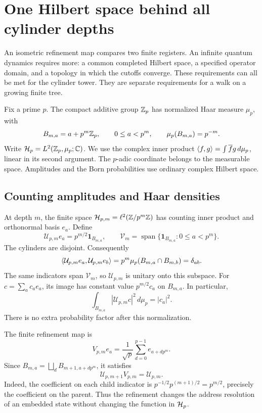 \section{One Hilbert space behind all cylinder depths}
\label{a-limit-hilbert}

An isometric refinement map compares two finite registers. An infinite
quantum dynamics requires more: a common completed Hilbert space, a
specified operator domain, and a topology in which the cutoffs converge.
These requirements can all be met for the cylinder tower. They are separate
requirements for a walk on a growing finite tree.

Fix a prime $p$. The compact additive group $\mathbb Z_p$ has normalized Haar
measure $\mu_p$, with
\[
 B_{m,a}=a+p^m\mathbb Z_p,\qquad 0\leq a<p^m,\qquad
 \mu_p(B_{m,a})=p^{-m}.
\]
Write $\mathcal H_p=L^2(\mathbb Z_p,\mu_p;\mathbb C)$. We use the complex inner product
$\left\langle f,g\right\rangle=\int\overline f g\,d\mu_p$, linear in its second argument.
The $p$-adic coordinate belongs to the measurable space. Amplitudes and the
Born probabilities use ordinary complex Hilbert space.

\subsection{Counting amplitudes and Haar densities}

At depth $m$, the finite space $\mathcal H_{p,m}=\ell^2(\mathbb Z/p^m\mathbb Z)$ has counting
inner product and orthonormal basis $e_a$. Define
\begin{equation}
 \mathcal U_{p,m}e_a=p^{m/2}\mathbf1_{B_{m,a}},
 \qquad \mathcal V_m=\operatorname{span}
 \{\mathbf1_{B_{m,a}}:0\leq a<p^m\}.
 \label{a-limit-cylinder-embedding}
\end{equation}
The cylinders are disjoint. Consequently
\[
 \left\langle\mathcal U_{p,m}e_a,\mathcal U_{p,m}e_b\right\rangle
 =p^m\mu_p(B_{m,a}\cap B_{m,b})=\delta_{ab}.
\]
The same indicators span $\mathcal V_m$, so $\mathcal U_{p,m}$ is unitary
onto this subspace. For $c=\sum_a c_ae_a$, its image has constant value
$p^{m/2}c_a$ on $B_{m,a}$. In particular,
\begin{equation}
 \int_{B_{m,a}}|\mathcal U_{p,m}c|^2\,d\mu_p=|c_a|^2.
 \label{a-limit-born-normalization}
\end{equation}
There is no extra probability factor after this normalization.

The finite refinement map is
\[
 V_{p,m}e_a=\frac1{\sqrt p}
 \sum_{d=0}^{p-1}e_{a+d p^m}.
\]
Since $B_{m,a}=\bigsqcup_d B_{m+1,a+d p^m}$, it satisfies
\begin{equation}
 \mathcal U_{p,m+1}V_{p,m}=\mathcal U_{p,m}.
 \label{a-limit-common-embedding}
\end{equation}
Indeed, the coefficient on each child indicator is
$p^{-1/2}p^{(m+1)/2}=p^{m/2}$, precisely the coefficient on the parent.
Thus the refinement changes the address resolution of an embedded state
without changing the function in $\mathcal H_p$.

